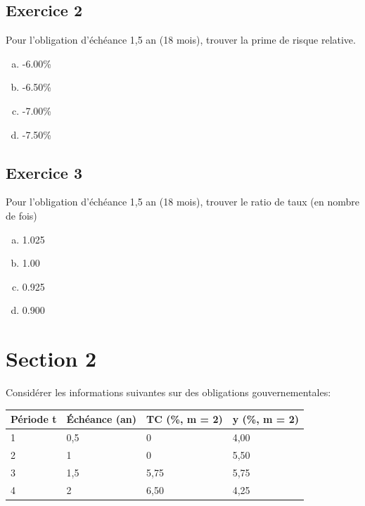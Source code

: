 \documentclass[10pt,a4paper]{article}
\begin{document}
\subsection*{Exercice 2}
Pour l'obligation d'échéance 1,5 an (18 mois),  trouver la prime de risque relative.


\begin{enumerate}[a)]
\item -6.00\%
\item -6.50\%
\item -7.00\%
\item -7.50\%
\end{enumerate}

\subsection*{Exercice 3}
Pour l'obligation d'échéance 1,5 an (18 mois),  trouver le ratio de taux (en nombre de fois)


\begin{enumerate}[a)]
\item 1.025
\item 1.00
\item 0.925
\item 0.900
\end{enumerate}

\section*{Section 2}
Considérer les informations suivantes sur des obligations gouvernementales:

\begin{table}[H]
\begin{center}
\begin{tabular}{|l|l|l|l|}
\hline
Période t & Échéance (an) & TC (\%, m = 2) & y (\%, m = 2) \\ \hline
1         & 0,5           & 0              & 4,00          \\ \hline
2         & 1             & 0              & 5,50          \\ \hline
3         & 1,5           & 5,75           & 5,75          \\ \hline
4         & 2             & 6,50           & 4,25          \\ \hline
\end{tabular}
\end{center}
\end{table}
\end{document}
